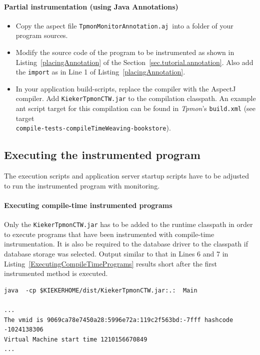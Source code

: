 \documentclass[a4paper,12pt]{scrartcl}
\newcommand{\tpmon}{\textit{Tpmon}}
\begin{document}
\paragraph{Partial instrumentation (using Java Annotations)}
\begin{itemize}
\item  Copy the aspect file \small \texttt{TpmonMonitorAnnotation.aj}\normalsize\ into a folder of your program sources.
\item Modify the source code of the program to be instrumented as shown in Listing~\ref{placingAnnotation} of the Section~\ref{sec.tutorial.annotation}. Also add the \texttt{import} as in Line 1 of Listing~\ref{placingAnnotation}.
\item In your application build-scripts, replace the compiler with the AspectJ compiler. Add \texttt{KiekerTpmonCTW.jar} to the compilation classpath. An example ant script target for this compilation can be found in \tpmon's \texttt{build.xml} (see target \\ \texttt{compile-tests-compileTimeWeaving-bookstore}).
\end{itemize}


\subsection{Executing the instrumented program} 

The execution scripts and application server startup scripts have to be adjusted to run the instrumented program with monitoring. 

\paragraph{Executing compile-time instrumented programs}

Only the \texttt{KiekerTpmonCTW.jar} has to be added to the runtime classpath in order to execute programs that have been instrumented with compile-time instrumentation. It is also be required to the database driver to the classpath if database storage was selected. Output similar to that in Lines 6 and 7 in Listing~\ref{ExecutingCompileTimePrograms} results short after the first instrumented method is executed.

\begin{lstlisting}[caption={Execution of a compile-time instrumented program},label={ExecutingCompileTimePrograms}]
java  -cp $KIEKERHOME/dist/KiekerTpmonCTW.jar:.:  Main

...
The vmid is 9069ca78e7450a28:5996e72a:119c2f563bd:-7fff hashcode -1024138306
Virtual Machine start time 1210156670849
...
\end{lstlisting}
\end{document}
